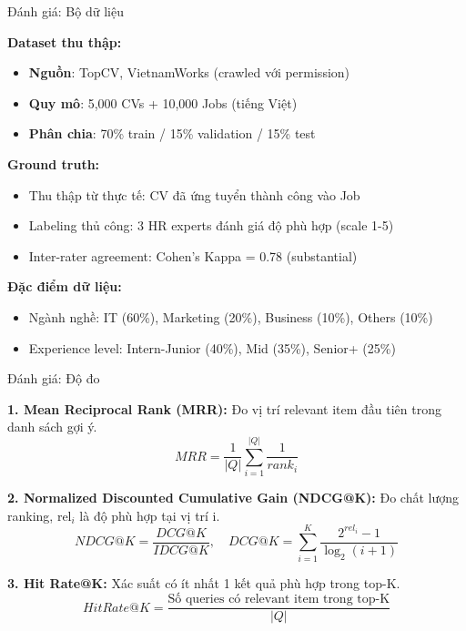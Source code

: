 \documentclass[aspectratio=169,xcolor=dvipsnames, t]{beamer}
\begin{document}

\begin{frame}{Đánh giá: Bộ dữ liệu}
\justifying

\textbf{Dataset thu thập:}
\begin{itemize}
    \item \textbf{Nguồn}: TopCV, VietnamWorks (crawled với permission)
    \item \textbf{Quy mô}: 5,000 CVs + 10,000 Jobs (tiếng Việt)
    \item \textbf{Phân chia}: 70\% train / 15\% validation / 15\% test
\end{itemize}

\vspace{0.3cm}
\textbf{Ground truth:}
\begin{itemize}
    \item Thu thập từ thực tế: CV đã ứng tuyển thành công vào Job
    \item Labeling thủ công: 3 HR experts đánh giá độ phù hợp (scale 1-5)
    \item Inter-rater agreement: Cohen's Kappa = 0.78 (substantial)
\end{itemize}

\vspace{0.3cm}
\textbf{Đặc điểm dữ liệu:}
\begin{itemize}
    \item Ngành nghề: IT (60\%), Marketing (20\%), Business (10\%), Others (10\%)
    \item Experience level: Intern-Junior (40\%), Mid (35\%), Senior+ (25\%)
\end{itemize}

\end{frame}

\begin{frame}{Đánh giá: Độ đo}
\justifying

\textbf{1. Mean Reciprocal Rank (MRR):} Đo vị trí relevant item đầu tiên trong danh sách gợi ý.
$$MRR = \frac{1}{|Q|} \sum_{i=1}^{|Q|} \frac{1}{rank_i}$$

\vspace{0.3cm}
\textbf{2. Normalized Discounted Cumulative Gain (NDCG@K):} Đo chất lượng ranking, rel$_i$ là độ phù hợp tại vị trí i.
$$NDCG@K = \frac{DCG@K}{IDCG@K}, \quad DCG@K = \sum_{i=1}^{K} \frac{2^{rel_i} - 1}{\log_2(i+1)}$$

\vspace{0.3cm}
\textbf{3. Hit Rate@K:} Xác suất có ít nhất 1 kết quả phù hợp trong top-K.
$$HitRate@K = \frac{\text{Số queries có relevant item trong top-K}}{|Q|}$$


\end{frame}
\end{document}
